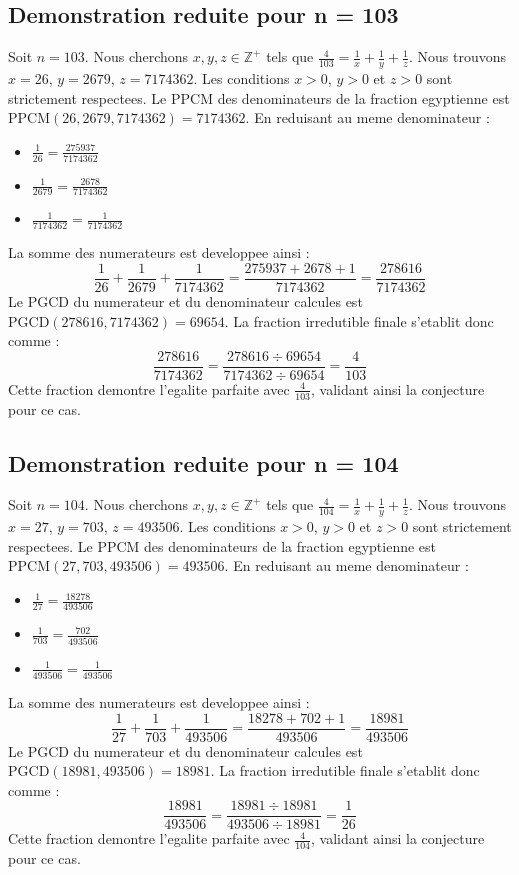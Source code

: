 \documentclass[11pt,a4paper]{article}
\begin{document}
\subsection{Demonstration reduite pour n = 103}
Soit $n = 103$. Nous cherchons $x, y, z \in \mathbb{Z}^{+}$ tels que $\frac{4}{103} = \frac{1}{x} + \frac{1}{y} + \frac{1}{z}$.
Nous trouvons $x = 26$, $y = 2679$, $z = 7174362$.
Les conditions $x > 0$, $y > 0$ et $z > 0$ sont strictement respectees.
Le PPCM des denominateurs de la fraction egyptienne est $\text{PPCM}(26, 2679, 7174362) = 7174362$.
En reduisant au meme denominateur :
\begin{itemize}
    \item $\frac{1}{26} = \frac{275937}{7174362}$
    \item $\frac{1}{2679} = \frac{2678}{7174362}$
    \item $\frac{1}{7174362} = \frac{1}{7174362}$
\end{itemize}
La somme des numerateurs est developpee ainsi :
$$ \frac{1}{26} + \frac{1}{2679} + \frac{1}{7174362} = \frac{275937 + 2678 + 1}{7174362} = \frac{278616}{7174362} $$
Le PGCD du numerateur et du denominateur calcules est $\text{PGCD}(278616, 7174362) = 69654$.
La fraction irredutible finale s'etablit donc comme :
$$ \frac{278616}{7174362} = \frac{278616 \div 69654}{7174362 \div 69654} = \frac{4}{103} $$
Cette fraction demontre l'egalite parfaite avec $\frac{4}{103}$, validant ainsi la conjecture pour ce cas.

\subsection{Demonstration reduite pour n = 104}
Soit $n = 104$. Nous cherchons $x, y, z \in \mathbb{Z}^{+}$ tels que $\frac{4}{104} = \frac{1}{x} + \frac{1}{y} + \frac{1}{z}$.
Nous trouvons $x = 27$, $y = 703$, $z = 493506$.
Les conditions $x > 0$, $y > 0$ et $z > 0$ sont strictement respectees.
Le PPCM des denominateurs de la fraction egyptienne est $\text{PPCM}(27, 703, 493506) = 493506$.
En reduisant au meme denominateur :
\begin{itemize}
    \item $\frac{1}{27} = \frac{18278}{493506}$
    \item $\frac{1}{703} = \frac{702}{493506}$
    \item $\frac{1}{493506} = \frac{1}{493506}$
\end{itemize}
La somme des numerateurs est developpee ainsi :
$$ \frac{1}{27} + \frac{1}{703} + \frac{1}{493506} = \frac{18278 + 702 + 1}{493506} = \frac{18981}{493506} $$
Le PGCD du numerateur et du denominateur calcules est $\text{PGCD}(18981, 493506) = 18981$.
La fraction irredutible finale s'etablit donc comme :
$$ \frac{18981}{493506} = \frac{18981 \div 18981}{493506 \div 18981} = \frac{1}{26} $$
Cette fraction demontre l'egalite parfaite avec $\frac{4}{104}$, validant ainsi la conjecture pour ce cas.
\end{document}
